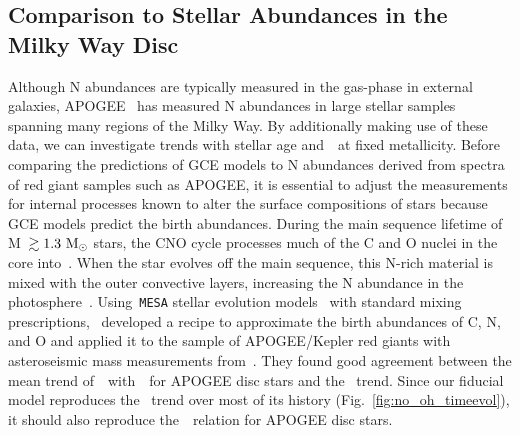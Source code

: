 \documentclass[ms.tex]{subfiles}
\begin{document}
\subsection{Comparison to Stellar Abundances in the Milky Way Disc}
\label{sec:results:vincenzo_comp}

Although N abundances are typically measured in the gas-phase in external
galaxies, APOGEE~\citep{Majewski2017} has measured N abundances in large
stellar samples spanning many regions of the Milky Way.
By additionally making use of these data, we can investigate trends with
stellar age and~\ofe~at fixed metallicity.
Before comparing the predictions of GCE models to N abundances derived from
spectra of red giant samples such as APOGEE, it is essential to adjust the
measurements for internal processes known to alter the surface compositions of
stars because GCE models predict the birth abundances.
During the main sequence lifetime of M~$\gtrsim 1.3~\text{M}_\odot$ stars, the CNO cycle
processes much of the C and O nuclei in the core into~\Nfourteen.
When the star evolves off the main sequence, this N-rich material is mixed with
the outer convective layers, increasing the N abundance in the
photosphere~\citep{Gilroy1989, Korn2007, Lind2008, Souto2018, Souto2019}.
Using~\texttt{MESA} stellar evolution models~\citep{Paxton2011, Paxton2013,
Paxton2015, Paxton2018} with standard mixing prescriptions,~\citet{Vincenzo2021}
developed a recipe to approximate the birth abundances of C, N, and O and
applied it to the sample of APOGEE/Kepler red giants with asteroseismic mass
measurements from~\citet{Miglio2021}.
They found good agreement between the mean trend of~\no~with~\oh~for APOGEE
disc stars and the~\citet{Dopita2016} trend.
Since our fiducial model reproduces the~\citet{Dopita2016} trend over most of
its history (Fig.~\ref{fig:no_oh_timeevol}), it should also reproduce
the~\ohno~relation for APOGEE disc stars.
\end{document}
